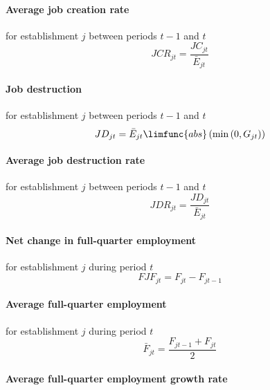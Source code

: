 \paragraph{Average job creation rate}

for establishment $j$ between periods $t-1$ and $t$%
\begin{equation}
JCR_{jt}=\frac{JC_{jt}}{\bar{E}_{jt}}  \label{eq:JCRjt}
\end{equation}

\paragraph{Job destruction}

for establishment $j$ between periods $t-1$ and $t$%
\begin{equation}
JD_{jt}=\bar{E}_{jt}\limfunc{abs}\left( \min \left( 0,G_{jt}\right) \right)
\label{eq:JDjt}
\end{equation}

\paragraph{Average job destruction rate}

for establishment $j$ between periods $t-1$ and $t$%
\begin{equation}
JDR_{jt}=\frac{JD_{jt}}{\bar{E}_{jt}}  \label{eq:JDRjt}
\end{equation}

\paragraph{Net change in full-quarter employment}

for establishment $j$ during period $t$%
\begin{equation}
FJF_{jt}=F_{jt}-F_{jt-1}  \label{eq:FJFjt}
\end{equation}

\paragraph{Average full-quarter employment}

for establishment $j$ during period $t$%
\begin{equation}
\bar{F}_{jt}=\frac{F_{jt-1}+F_{jt}}{2}  \label{eq:Fbarjt}
\end{equation}

\paragraph{Average full-quarter employment growth rate}


